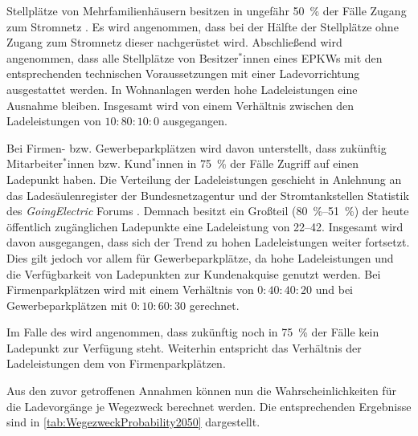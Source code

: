 Stellplätze von Mehrfamilienhäusern besitzen in ungefähr \SI{50}{\percent} der Fälle Zugang zum Stromnetz \cite{dena2020}.
Es wird angenommen, dass bei der Hälfte der Stellplätze ohne Zugang zum Stromnetz dieser nachgerüstet wird.
Abschließend wird angenommen, dass alle Stellplätze von Besitzer$^*$innen eines \glspl{EPKW} mit den entsprechenden technischen Voraussetzungen mit einer Ladevorrichtung ausgestattet werden.
In Wohnanlagen werden hohe Ladeleistungen eine Ausnahme bleiben.
Insgesamt wird von einem Verhältnis zwischen den Ladeleistungen von \(10:80:10:0\) ausgegangen.\medskip

Bei Firmen- bzw. Gewerbeparkplätzen wird davon unterstellt, dass zukünftig Mitarbeiter$^*$innen bzw. Kund$^*$innen in \SI{75}{\percent} der Fälle Zugriff auf einen Ladepunkt haben.
Die Verteilung der Ladeleistungen geschieht in Anlehnung an das Ladesäulenregister der Bundesnetzagentur \cite[][Stand: ]{BundesnetzagenturElektrizitaet2020} und der Stromtankstellen Statistik des \textit{GoingElectric} Forums \cite[][Stand: ]{Weemaes2020}.
Demnach besitzt ein Großteil (\SIrange[range-phrase=~bzw.~]{80}{51}{\percent}) der heute öffentlich zugänglichen Ladepunkte eine Ladeleistung von \SIrange{22}{42}{\kw}.
Insgesamt wird davon ausgegangen, dass sich der Trend zu hohen Ladeleistungen weiter fortsetzt.
Dies gilt jedoch vor allem für Gewerbeparkplätze, da hohe Ladeleistungen und die Verfügbarkeit von Ladepunkten zur Kundenakquise genutzt werden.
Bei Firmenparkplätzen wird mit einem Verhältnis von \(0:40:40:20\) und bei Gewerbeparkplätzen mit \(0:10:60:30\) gerechnet.\medskip

Im Falle des \UCs \Straszenrand wird angenommen, dass zukünftig noch in \SI{75}{\percent} der Fälle kein Ladepunkt zur Verfügung steht.
Weiterhin entspricht das Verhältnis der Ladeleistungen dem von Firmenparkplätzen.\medskip

Aus den zuvor getroffenen Annahmen können nun die Wahrscheinlichkeiten für die Ladevorgänge je Wegezweck berechnet werden.
Die entsprechenden Ergebnisse sind in \autoref{tab:WegezweckProbability2050} dargestellt.




